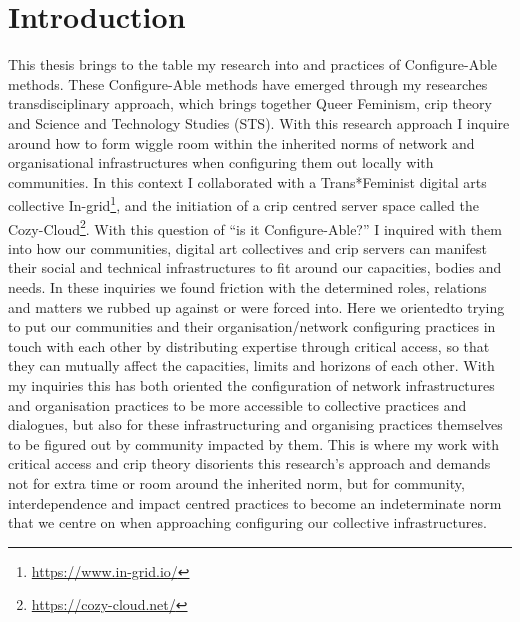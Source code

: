 \hypertarget{introduction}{%
\section[Introduction]{\texorpdfstring{\protect\hypertarget{anchor}{}{}Introduction}{Introduction}}\label{introduction}}

This thesis brings to the table my research into and practices of
Configure-Able methods. These Configure-Able methods have emerged
through my researches transdisciplinary approach, which brings together
Queer Feminism, crip theory and Science and Technology Studies (STS).
With this research approach I inquire around how to form wiggle room
within the inherited norms of network and organisational infrastructures
when configuring them out locally with communities. In this context I
collaborated with a Trans*Feminist digital arts collective
In-grid\footnote{\url{https://www.in-grid.io/}}, and the initiation of a
crip centred server space called the Cozy-Cloud\footnote{\url{https://cozy-cloud.net/}}.
With this question of ``is it Configure-Able?'' I inquired with them
into how our communities, digital art collectives and crip servers can
manifest their social and technical infrastructures to fit around our
capacities, bodies and needs. In these inquiries we found friction with
the determined roles, relations and matters we rubbed up against or were
forced into. Here we orientedto trying to put our communities and their
organisation/network configuring practices in touch with each other by
distributing expertise through critical access, so that they can
mutually affect the capacities, limits and horizons of each other. With
my inquiries this has both oriented the configuration of network
infrastructures and organisation practices to be more accessible to
collective practices and dialogues, but also for these infrastructuring
and organising practices themselves to be figured out by community
impacted by them. This is where my work with critical access and crip
theory disorients this research's approach and demands not for extra
time or room around the inherited norm, but for community,
interdependence and impact centred practices to become an indeterminate
norm that we centre on when approaching configuring our collective
infrastructures.

